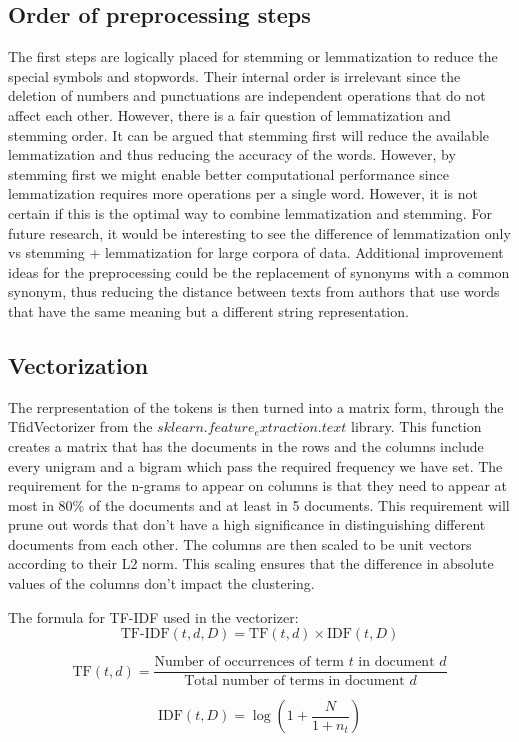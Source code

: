 \subsection{Order of preprocessing steps}

The first steps are logically placed for stemming or lemmatization to reduce the special symbols and stopwords. Their internal order is irrelevant since the deletion of numbers and punctuations are independent operations that do not affect each other. However, there is a fair question of lemmatization and stemming order. It can be argued that stemming first will reduce the available lemmatization and thus reducing the accuracy of the words. However, by stemming first we might enable better computational performance since lemmatization requires more operations per a single word. However, it is not certain if this is the optimal way to combine lemmatization and stemming. For future research, it would be interesting to see the difference of lemmatization only vs stemming + lemmatization for large corpora of data. Additional improvement ideas for the preprocessing could be the replacement of synonyms with a common synonym, thus reducing the distance between texts from authors that use words that have the same meaning but a different string representation.


\subsection{Vectorization}

The rerpresentation of the tokens is then turned into a matrix form, through the TfidVectorizer from the $sklearn.feature_extraction.text$ library. This function creates a matrix that has the documents in the rows and the columns include every unigram and a bigram which pass the required frequency we have set. The requirement for the n-grams to appear on columns is that they need to appear at most in 80\% of the documents and at least in 5 documents. This requirement will prune out words that don't have a high significance in distinguishing different documents from each other. The columns are then scaled to be unit vectors according to their L2 norm. This scaling ensures that the difference in absolute values of the columns don't impact the clustering.

The formula for TF-IDF used in the vectorizer:
\[
    \text{TF-IDF}(t, d, D) = \text{TF}(t, d) \times \text{IDF}(t, D)
\]

\[
    \text{TF}(t, d) = \frac{\text{Number of occurrences of term } t \text{ in document } d}{\text{Total number of terms in document } d}
\]

\[
    \text{IDF}(t, D) = \log\left(1 + \frac{N}{1 + n_t}\right)
\]

